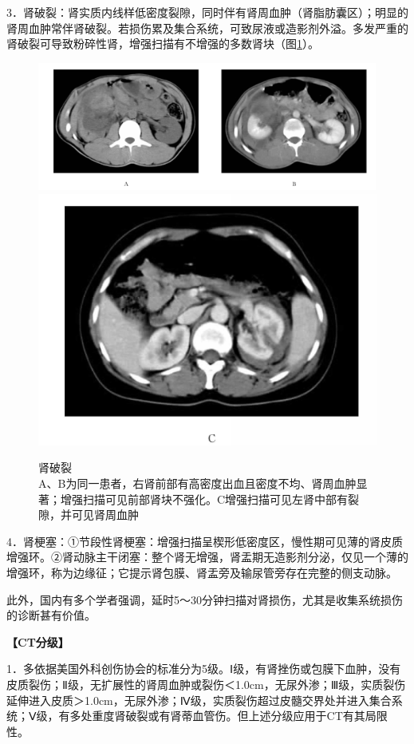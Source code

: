 3．肾破裂：肾实质内线样低密度裂隙，同时伴有肾周血肿（肾脂肪囊区）；明显的肾周血肿常伴肾破裂。若损伤累及集合系统，可致尿液或造影剂外溢。多发严重的肾破裂可导致粉碎性肾，增强扫描有不增强的多数肾块（图\ref{fig20-5}）。

\begin{figure}[!htbp]
 \centering
 \includegraphics[width=.7\textwidth,height=\textheight,keepaspectratio]{./images/Image00393.jpg}
 \includegraphics[width=.7\textwidth,height=\textheight,keepaspectratio]{./images/Image00394.jpg}
 \captionsetup{justification=centering}
 \caption{肾破裂\\{\small A、B为同一患者，右肾前部有高密度出血且密度不均、肾周血肿显著；增强扫描可见前部肾块不强化。C增强扫描可见左肾中部有裂隙，并可见肾周血肿}}
 \label{fig20-5}
  \end{figure} 

4．肾梗塞：①节段性肾梗塞：增强扫描呈楔形低密度区，慢性期可见薄的肾皮质增强环。②肾动脉主干闭塞：整个肾无增强，肾盂期无造影剂分泌，仅见一个薄的增强环，称为边缘征；它提示肾包膜、肾盂旁及输尿管旁存在完整的侧支动脉。

此外，国内有多个学者强调，延时5～30分钟扫描对肾损伤，尤其是收集系统损伤的诊断甚有价值。

\textbf{【CT分级】}

1．多依据美国外科创伤协会的标准分为5级。Ⅰ级，有肾挫伤或包膜下血肿，没有皮质裂伤；Ⅱ级，无扩展性的肾周血肿或裂伤＜1.0cm，无尿外渗；Ⅲ级，实质裂伤延伸进入皮质＞1.0cm，无尿外渗；Ⅳ级，实质裂伤超过皮髓交界处并进入集合系统；Ⅴ级，有多处重度肾破裂或有肾蒂血管伤。但上述分级应用于CT有其局限性。

